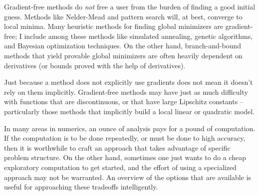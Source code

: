 \documentclass[12pt, leqno]{article} %
\begin{document}
Gradient-free methods do \emph{not} free a user from the burden of
finding a good initial guess. Methods like Nelder-Mead and pattern
search will, at best, converge to local minima. Many heuristic methods
for finding global minimizers are gradient-free; I include among these
methods like simulated annealing, genetic algorithms, and Bayesian
optimization techniques. On the other hand, branch-and-bound methods
that yield provable global minimizers are often heavily dependent on
derivatives (or bounds proved with the help of derivatives).

Just because a method does not explicitly use gradients does not mean it
doesn't rely on them implicitly. Gradient-free methods may have just as
much difficulty with functions that are discontinuous, or that have
large Lipschitz constants -- particularly those methods that implicitly
build a local linear or quadratic model.

In many areas in numerics, an ounce of analysis pays for a pound of
computation. If the computation is to be done repeatedly, or must be
done to high accuracy, then it is worthwhile to craft an approach that
takes advantage of specific problem structure. On the other hand,
sometimes one just wants to do a cheap exploratory computation to get
started, and the effort of using a specialized approach may not be
warranted. An overview of the options that are available is useful for
approaching these tradeoffs intelligently.
\end{document}
